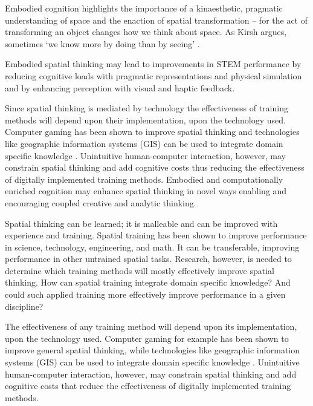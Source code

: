 Embodied cognition highlights the importance of a kinaesthetic, pragmatic understanding of space
and the enaction of spatial transformation -- for the act of transforming an object changes how we think about space. 
As Kirsh argues, sometimes `we know more by doing than by seeing' \citeyearpar{Kirsh2013}.

Embodied spatial thinking may lead to improvements in STEM performance by reducing cognitive loads with pragmatic representations and physical simulation and by enhancing perception with visual and haptic feedback. 

Since spatial thinking is mediated by technology the effectiveness of training methods will depend upon their implementation, upon the technology used. 
Computer gaming has been shown to improve spatial thinking and technologies like geographic information systems (GIS) can be used to integrate domain specific knowledge \citep{Uttal2013}.
Unintuitive human-computer interaction, however, may constrain spatial thinking and add cognitive costs thus reducing the effectiveness of digitally implemented training methods. 
Embodied and computationally enriched cognition may enhance spatial thinking in novel ways
enabling and encouraging coupled creative and analytic thinking.




Spatial thinking can be learned; it is malleable and can be improved with experience and training. 
Spatial training has been shown to improve performance in science, technology, engineering, and math. 
It can be transferable, improving performance in other untrained spatial tasks. 
Research, however, is needed to determine which training methods will mostly effectively improve spatial thinking. 
How can spatial training integrate domain specific knowledge? And could such applied training more effectively improve performance in a given discipline? \cite{Uttal2013} 

The effectiveness of any training method will depend upon its implementation, upon the technology used. 
Computer gaming for example has been shown to improve general spatial thinking, while technologies like geographic information systems (GIS) can be used to integrate domain specific knowledge \cite{Uttal2013}.
Unintuitive human-computer interaction, however, may constrain spatial thinking and add cognitive costs that reduce the effectiveness of digitally implemented training methods. 



